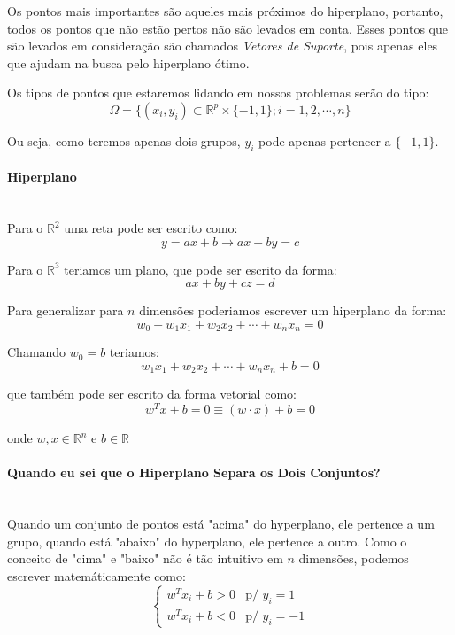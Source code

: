 \documentclass{article}
\begin{document}
Os pontos mais importantes são aqueles mais próximos do hiperplano, portanto, todos os pontos que não estão pertos não são levados em conta. Esses pontos que são levados em consideração são chamados \textit{Vetores de Suporte}, pois apenas eles que ajudam na busca pelo hiperplano ótimo.

Os tipos de pontos que estaremos lidando em nossos problemas serão do tipo:
\[\Omega =\{(x_i,y_i)\subset\mathbb{R}^{p}\times\{-1,1\};i=1,2,\cdots,n\}\]

Ou seja, como teremos apenas dois grupos, \(y_i\) pode apenas pertencer a \(\{-1,1\}\).

\paragraph{Hiperplano} \hspace{0pt}\\

Para o \(\mathbb{R}^2\) uma reta pode ser escrito como:
\[y=ax+b\rightarrow ax+by=c\]

Para o \(\mathbb{R}^3\) teriamos um plano, que pode ser escrito da forma:
\[ax+by+cz=d\]

Para generalizar para \(n\) dimensões poderiamos escrever um hiperplano da forma:
\[w_0+w_1x_1+w_2x_2+\cdots+w_nx_n=0\]

Chamando \(w_0=b\) teriamos:
\[w_1x_1+w_2x_2+\cdots+w_nx_n+b=0\]

que também pode ser escrito da forma vetorial como:
\[w^Tx+b=0\equiv (w\cdot x)+b=0\]

onde \(w,x\in\mathbb{R}^n\) e \(b\in\mathbb{R}\)



\paragraph{Quando eu sei que o Hiperplano Separa os Dois Conjuntos?}\hspace{0pt}\\

Quando um conjunto de pontos está "acima" do hyperplano, ele pertence a um grupo, quando está "abaixo" do hyperplano, ele pertence a outro. 
Como o conceito de "cima" e "baixo" não é tão intuitivo em \(n\) dimensões, podemos escrever matemáticamente como:
\begin{equation}
    \begin{cases}
        w^Tx_i+b>0 &\text{p/ } y_i=1 \\w^Tx_i+b<0 &\text{p/ } y_i=-1
    \end{cases}
\end{equation}
\end{document}
